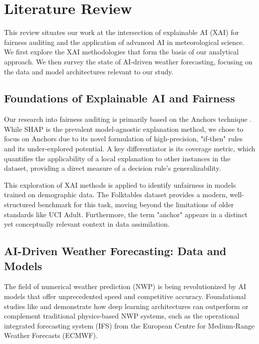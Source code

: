 \section{Literature Review}
This review situates our work at the intersection of explainable AI (XAI) for fairness auditing and the application of advanced AI in meteorological science. We first explore the XAI methodologies that form the basis of our analytical approach. We then survey the state of AI-driven weather forecasting, focusing on the data and model architectures relevant to our study.

\subsection{Foundations of Explainable AI and Fairness}

Our research into fairness auditing is primarily based on the Anchors technique \cite{anchors-ribeiro}. While SHAP \cite{shap-lundberg} is the prevalent model-agnostic explanation method, we chose to focus on Anchors due to its novel formulation of high-precision, "if-then" rules and its under-explored potential. A key differentiator is its coverage metric, which quantifies the applicability of a local explanation to other instances in the dataset, providing a direct measure of a decision rule's generalizability.

This exploration of XAI methods is applied to identify unfairness in models trained on demographic data. The Folktables dataset \cite{folktables-ding} provides a modern, well-structured benchmark for this task, moving beyond the limitations of older standards like UCI Adult. Furthermore, the term "anchor" appears in a distinct yet conceptually relevant context in data assimilation.

\subsection{AI-Driven Weather Forecasting: Data and Models}

The field of numerical weather prediction (NWP) is being revolutionized by AI models that offer unprecedented speed and competitive accuracy. Foundational studies like \cite{weather-forecasting-bi} and \cite{graph-cast-remi} demonstrate how deep learning architectures can outperform or complement traditional physics-based NWP systems, such as the operational integrated forecasting system (IFS) from the European Centre for Medium-Range Weather Forecasts (ECMWF).


